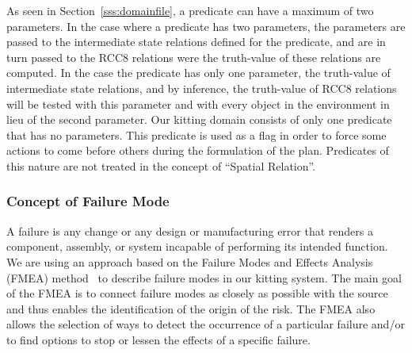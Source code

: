 \begin{itemize}
As seen in Section~\ref{sss:domainfile}, a predicate can have a maximum of two parameters. In the case where a predicate has two parameters, the parameters are passed to the intermediate state relations defined for the predicate, and are in turn passed to the RCC8 relations were the truth-value of these relations are computed. In the case the predicate has only one parameter, the truth-value of intermediate state relations, and by inference, the truth-value of RCC8 relations will be tested with this parameter and with every object in the environment in lieu of the second parameter. Our kitting domain consists of only one predicate that has no parameters. This predicate is used as a flag in order to force some actions to come before others during the formulation of the plan. Predicates of this nature are not treated in the concept of ``Spatial Relation''.
\end{itemize}

\subsubsection{Concept of Failure Mode}\label{sss:failure}
A failure is any change or any design or manufacturing error that renders a component, assembly, or system incapable of performing its intended function. We are using an approach based on the Failure Modes and Effects Analysis (FMEA) method~\cite{NANNIKAR.ICTBM.2012} to describe failure modes in our kitting system. The main goal of the FMEA is to connect failure modes as closely as possible with the source and thus enables the identification of the origin of the risk. The FMEA also allows the selection of ways to detect the occurrence of a particular failure and/or to find options to stop or lessen the effects of a specific failure.




